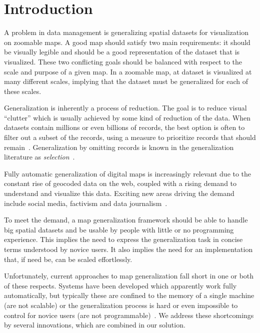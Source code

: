 \section{Introduction}
A problem in data management is generalizing spatial datasets for visualization on zoomable maps. A good map should satisfy two main requirements: it should be visually legible and should be a good representation of the dataset that is visualized. These two conflicting goals should be balanced with respect to the scale and purpose of a given map. In a zoomable map, at dataset is visualized at many different scales, implying that the dataset must be generalized for each of these scales. 

Generalization is inherently a process of reduction. The goal is to reduce visual ``clutter'' which is usually achieved by some kind of reduction of the data. When datasets contain millions or even billions of records, the best option is often to filter out a subset of the records, using a measure to prioritize records that should remain~\cite{sarma2012fusiontables}. Generalization by omitting records is known in the generalization literature as \emph{selection}~\cite{weibel1999generalising}.

Fully automatic generalization of digital maps is increasingly relevant due to the constant rise of geocoded data on the web, coupled with a rising demand to understand and visualize this data. Exciting new areas driving the demand include social media, factivism and data journalism~\cite{cohen2011journalism}. 

To meet the demand, a map generalization framework should be able to handle big spatial datasets and be usable by people with little or no programming experience. This implies the need to express the generalization task in concise terms understood by novice users. It also implies the need for an implementation that, if need be, can be scaled effortlessly.

Unfortunately, current approaches to map generalization fall short in one or both of these respects. Systems have been developed which apparently work fully automatically, but typically these are confined to the memory of a single machine (are not scalable) or the generalization process is hard or even impossible to control for novice users (are not programmable)~\cite{sarma2012fusiontables}. We address these shortcomings by several innovations, which are combined in our solution.

